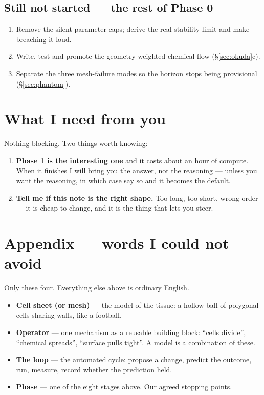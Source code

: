 \documentclass[11pt,a4paper]{article}
\begin{document}
\subsection{Still not started --- the rest of Phase 0}

\begin{enumerate}
\item Remove the silent parameter caps; derive the real stability limit and make breaching it loud.
\item Write, test and promote the geometry-weighted chemical flow (\S\ref{sec:okuda}c).
\item Separate the three mesh-failure modes so the horizon stops being provisional
(\S\ref{sec:phantom}).
\end{enumerate}

\section{What I need from you}

Nothing blocking. Two things worth knowing:

\begin{enumerate}[leftmargin=1.4em]
\item \textbf{Phase 1 is the interesting one} and it costs about an hour of compute. When it
finishes I will bring you the answer, not the reasoning --- unless you want the reasoning, in which
case say so and it becomes the default.
\item \textbf{Tell me if this note is the right shape.} Too long, too short, wrong order --- it is
cheap to change, and it is the thing that lets you steer.
\end{enumerate}

\section*{Appendix --- words I could not avoid}

Only these four. Everything else above is ordinary English.

\begin{itemize}
\item \textbf{Cell sheet (or mesh)} --- the model of the tissue: a hollow ball of polygonal cells
sharing walls, like a football.
\item \textbf{Operator} --- one mechanism as a reusable building block: ``cells divide'',
``chemical spreads'', ``surface pulls tight''. A model is a combination of these.
\item \textbf{The loop} --- the automated cycle: propose a change, predict the outcome, run,
measure, record whether the prediction held.
\item \textbf{Phase} --- one of the eight stages above. Our agreed stopping points.
\end{itemize}
\end{document}
